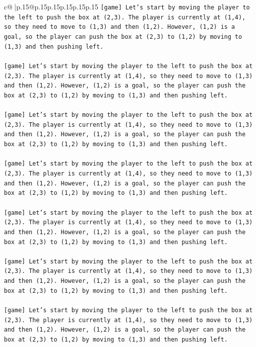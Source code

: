 \documentclass{article}
\begin{document}
{\begin{supertabular}{c@{$\;$}|p{.15\linewidth}@{}p{.15\linewidth}p{.15\linewidth}p{.15\linewidth}p{.15\linewidth}p{.15\linewidth}}
{{{\texttt{{[}game{]} Let's start by moving the player to the left to push the box at (2,3). The player is currently at (1,4), so they need to move to (1,3) and then (1,2). However, (1,2) is a goal, so the player can push the box at (2,3) to (1,2) by moving to (1,3) and then pushing left.} \\
\\ 
\texttt{{[}game{]} Let's start by moving the player to the left to push the box at (2,3). The player is currently at (1,4), so they need to move to (1,3) and then (1,2). However, (1,2) is a goal, so the player can push the box at (2,3) to (1,2) by moving to (1,3) and then pushing left.} \\
\\ 
\texttt{{[}game{]} Let's start by moving the player to the left to push the box at (2,3). The player is currently at (1,4), so they need to move to (1,3) and then (1,2). However, (1,2) is a goal, so the player can push the box at (2,3) to (1,2) by moving to (1,3) and then pushing left.} \\
\\ 
\texttt{{[}game{]} Let's start by moving the player to the left to push the box at (2,3). The player is currently at (1,4), so they need to move to (1,3) and then (1,2). However, (1,2) is a goal, so the player can push the box at (2,3) to (1,2) by moving to (1,3) and then pushing left.} \\
\\ 
\texttt{{[}game{]} Let's start by moving the player to the left to push the box at (2,3). The player is currently at (1,4), so they need to move to (1,3) and then (1,2). However, (1,2) is a goal, so the player can push the box at (2,3) to (1,2) by moving to (1,3) and then pushing left.} \\
\\ 
\texttt{{[}game{]} Let's start by moving the player to the left to push the box at (2,3). The player is currently at (1,4), so they need to move to (1,3) and then (1,2). However, (1,2) is a goal, so the player can push the box at (2,3) to (1,2) by moving to (1,3) and then pushing left.} \\
\\ 
\texttt{{[}game{]} Let's start by moving the player to the left to push the box at (2,3). The player is currently at (1,4), so they need to move to (1,3) and then (1,2). However, (1,2) is a goal, so the player can push the box at (2,3) to (1,2) by moving to (1,3) and then pushing left.} \\
\\ 
}}}
\end{supertabular}}
\end{document}
